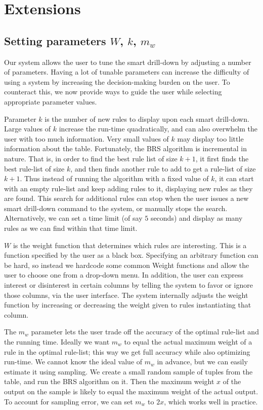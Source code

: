 \documentclass[10pt,journal,compsoc]{IEEEtran}
\newcommand{\papertext}[1]{#1}
\begin{document}
\papertext{
\vspace{-5pt}
\section{Extensions}\label{sec:extensions}
\papertext{
\subsection{Setting parameters $W$, $k$, $m_w$}\label{sec:setting-paramters}
Our system allows the user to tune the smart drill-down by adjusting a number of parameters. Having a lot of tunable parameters can increase the difficulty of using a system by increasing the decision-making burden on the user. To counteract this, we now provide ways to guide the user while selecting appropriate parameter values.

Parameter $k$ is the number of new rules to display upon each smart drill-down. Large values of $k$ increase the run-time quadratically, and can also overwhelm the user with too much information. Very small values of $k$ may display too little information about the table. Fortunately, the BRS algorithm is incremental in nature. That is, in order to find the best rule list of size $k+1$, it first finds the best rule-list of size $k$, and then finds another rule to add to get a rule-list of size $k+1$. Thus instead of running the algorithm with a fixed value of $k$, it can start with an empty rule-list and keep adding rules to it, displaying new rules as they are found. This search for additional rules can stop when the user issues a new smart drill-down command to the system, or manually stops the search. Alternatively, we can set a time limit (of say $5$ seconds) and display as many rules as we can find within that time limit.

$W$ is the weight function that determines which rules are interesting. This is a function specified by the user as a black box. Specifying an arbitrary function can be hard, so instead we hardcode some common Weight functions and allow the user to choose one from a drop-down menu. In addition, the user can express interest or disinterest in certain columns by telling the system to favor or ignore those columns, via the user interface. The system internally adjusts the weight function by increasing or decreasing the weight given to rules instantiating that column.

The $m_w$ parameter lets the user trade off the accuracy of the optimal rule-list and the running time. Ideally we want $m_w$ to equal the actual maximum weight of a rule in the optimal rule-list; this way we get full accuracy while also optimizing run-time. We cannot know the ideal value of $m_w$ in advance, but we can easily estimate it using sampling. We create a small random sample of tuples from the table, and run the BRS algorithm on it. Then the maximum weight $x$ of the output on the sample is likely to equal the maximum weight of the actual output. To account for sampling error, we can set $m_w$ to $2x$, which works well in practice.

}}
\end{document}
